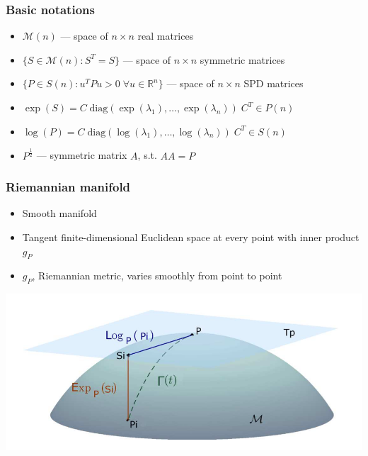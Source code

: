 \documentclass{beamer}
\begin{document}
\begin{frame}
\frametitle{Basic notations}
\begin{itemize}
	\item $\mathcal{M}(n)$ --- space of $n\times n$ real matrices
	\vfill
	\item $\{S \in \mathcal{M}(n): S^T = S  \}$ --- space of $n\times n$ symmetric matrices
		\vfill
	\item $\{P \in S(n): u^TPu > 0 \; \forall u \in \mathbb{R}^n  \}$ --- space of $n\times n$ SPD matrices
		\vfill
	\item $\exp(S) = C\; \text{diag}(\exp(\lambda_1), \dots, \exp(\lambda_n) ) \; C^T  \in P(n)$
		\vfill
	\item $\log(P) = C\; \text{diag}(\log(\lambda_1), \dots, \log(\lambda_n) ) \; C^T \in S(n)$
		\vfill
	\item $P^{\frac12}$ --- symmetric matrix $A$, s.t. $AA = P$
\end{itemize}

\end{frame}


\begin{frame}
\frametitle{Riemannian manifold}
\begin{itemize}
\item Smooth manifold
\item Tangent finite-dimensional Euclidean space at every point with inner product $g_P$
\item $g_P$, Riemannian metric, varies smoothly from point to point

\end{itemize}
 \hfill \includegraphics[scale=0.5]{manifold.png}
\end{frame}

\end{document}
